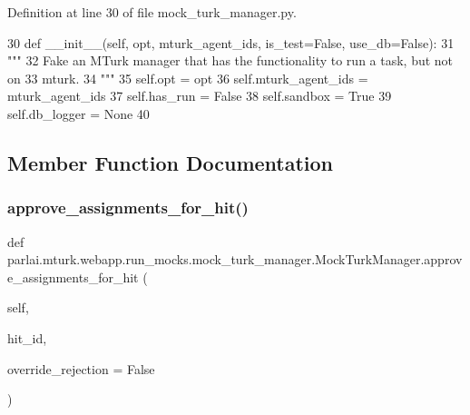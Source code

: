 Definition at line 30 of file mock\+\_\+turk\+\_\+manager.\+py.


\begin{DoxyCode}
30     \textcolor{keyword}{def }\_\_init\_\_(self, opt, mturk\_agent\_ids, is\_test=False, use\_db=False):
31         \textcolor{stringliteral}{"""}
32 \textcolor{stringliteral}{        Fake an MTurk manager that has the functionality to run a task, but not on}
33 \textcolor{stringliteral}{        mturk.}
34 \textcolor{stringliteral}{        """}
35         self.opt = opt
36         self.mturk\_agent\_ids = mturk\_agent\_ids
37         self.has\_run = \textcolor{keyword}{False}
38         self.sandbox = \textcolor{keyword}{True}
39         self.db\_logger = \textcolor{keywordtype}{None}
40 
\end{DoxyCode}


\subsection{Member Function Documentation}
\mbox{\label{classparlai_1_1mturk_1_1webapp_1_1run__mocks_1_1mock__turk__manager_1_1MockTurkManager_ad6aa11f2ea976e7ec50761b59affa96d}} 
\subsubsection{\texorpdfstring{approve\+\_\+assignments\+\_\+for\+\_\+hit()}{approve\_assignments\_for\_hit()}}
{\footnotesize\ttfamily def parlai.\+mturk.\+webapp.\+run\+\_\+mocks.\+mock\+\_\+turk\+\_\+manager.\+Mock\+Turk\+Manager.\+approve\+\_\+assignments\+\_\+for\+\_\+hit (\begin{DoxyParamCaption}\item[{}]{self,  }\item[{}]{hit\+\_\+id,  }\item[{}]{override\+\_\+rejection = {\ttfamily False} }\end{DoxyParamCaption})}



